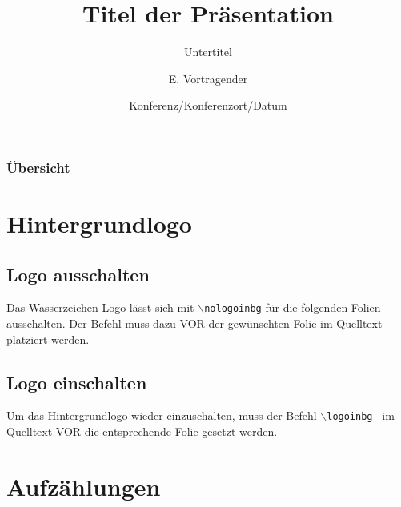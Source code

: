\documentclass{beamer}
\title{Titel der Präsentation}
\subtitle{Untertitel}
\author{E. Vortragender}
\institute[Uni Greifswald] %
{ 
	Institut für , \\
  	Ernst-Moritz-Arndt-Universität Greifswald
}
\date[Konf./Dat.] %
{Konferenz/Konferenzort/Datum}
\begin{document}
\begin{frame}
\maketitle
\end{frame}

\begin{frame}
\frametitle{Übersicht}
\tableofcontents
\end{frame}

\section{Hintergrundlogo}
\subsection{Logo ausschalten}

\nologoinbg

\begin{frame}{\insertsection}{\insertsubsection}
 Das Wasserzeichen-Logo lässt sich mit {\tt $\backslash$nologoinbg} für die folgenden Folien ausschalten. Der Befehl muss dazu VOR der gewünschten Folie im Quelltext platziert werden.
\bigskip
 
\end{frame}


\subsection{Logo einschalten}

\logoinbg
\begin{frame}{\insertsection}{\insertsubsection}
Um das Hintergrundlogo wieder einzuschalten, muss der Befehl {\tt $\backslash$logoinbg }
im Quelltext VOR die entsprechende Folie gesetzt werden.
\end{frame}


\section{Aufzählungen}
\end{document}

